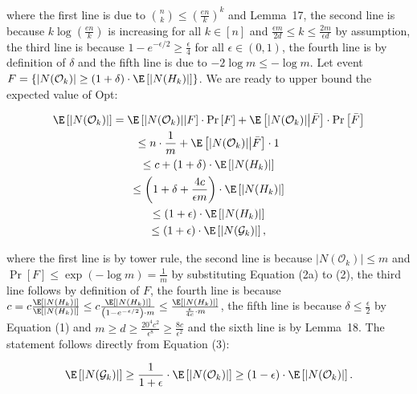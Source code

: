where the first line is due to $\binom{n}{k}\leq\left(\frac{en}{k}\right)^{k}$ and Lemma 17, the second line is because $k\log\left(\frac{en}{k}\right)$ is increasing for all $k\in[n]$ and $\frac{\epsilon m}{2d}\leq k\leq\frac{2m}{\epsilon d}$ by assumption, the third line is because $1-e^{-\epsilon/2}\geq\frac{\epsilon}{4}$ for all $\epsilon\in(0,1)$, the fourth line is by definition of $\delta$ and the fifth line is due to $-2\log{m}\leq-\log{m}$.
Let event $F=\{|N(\mathcal{O}_{k})|\geq(1+\delta)\cdot\E\left[|N(H_{k})|\right]\}$.
We are ready to upper bound the expected value of Opt:\par


\[\begin{gathered}
\displaystyle\E\left[|N(\mathcal{O}_{k})|\right] \displaystyle=\E\left[|N(\mathcal{O}_{k})|\middle|F\right]\cdot\Pr\left[F\right]+\E\left[|N(\mathcal{O}_{k})|\middle|\bar{F}\right]\cdot\Pr\left[\bar{F}\right] \\
\displaystyle\leq n\cdot\frac{1}{m}+\E\left[|N(\mathcal{O}_{k})|\middle|\bar{F}\right]\cdot 1 \\
\displaystyle\leq c+(1+\delta)\cdot\E\left[|N(H_{k})|\right] \\
\displaystyle\leq\left(1+\delta+\frac{4c}{\epsilon m}\right)\cdot\E\left[|N(H_{k})|\right] \\
\displaystyle\leq\left(1+\epsilon\right)\cdot\E\left[|N(H_{k})|\right] \\
\displaystyle\leq\left(1+\epsilon\right)\cdot\E\left[|N(\mathcal{G}_{k})|\right],
\end{gathered}\]


where the first line is by tower rule, the second line is because $|N(\mathcal{O}_{k})|\leq m$ and $\Pr\left[F\right]\leq\exp\left(-\log{m}\right)=\frac{1}{m}$ by substituting Equation (2a) to (2), the third line follows by definition of $F$, the fourth line is because $c=c\frac{\E\left[|N(H_{k})|\right]}{\E\left[|N(H_{k})|\right]}\leq c\frac{\E\left[|N(H_{k})|\right]}{\left(1-e^{-\epsilon/2}\right)\cdot m}\leq\frac{\E\left[|N(H_{k})|\right]}{\frac{\epsilon}{4c}\cdot m}$, the fifth line is because $\delta\leq\frac{\epsilon}{2}$ by Equation (1) and $m\geq d\geq\frac{20^{4}c^{2}}{\epsilon^{8}}\geq\frac{8c}{\epsilon^{2}}$ and the sixth line is by Lemma 18.
The statement follows directly from Equation (3):\par


\[\begin{gathered}
\displaystyle\E\left[|N(\mathcal{G}_{k})|\right]\geq\frac{1}{1+\epsilon}\cdot\E\left[|N(\mathcal{O}_{k})|\right]\geq\left(1-\epsilon\right)\cdot\E\left[|N(\mathcal{O}_{k})|\right].
\end{gathered}\]


